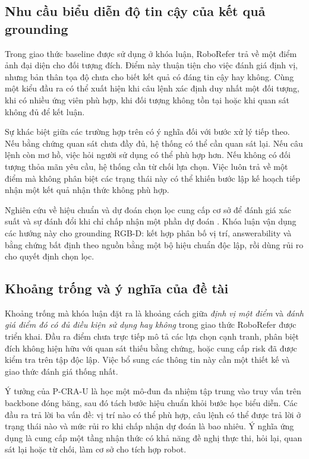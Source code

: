 \subsection{Nhu cầu biểu diễn độ tin cậy của kết quả grounding}

Trong giao thức baseline được sử dụng ở khóa luận, RoboRefer trả về một điểm ảnh đại diện cho đối tượng đích. Điểm này thuận tiện cho việc đánh giá định vị, nhưng bản thân tọa độ chưa cho biết kết quả có đáng tin cậy hay không. Cùng một kiểu đầu ra có thể xuất hiện khi câu lệnh xác định duy nhất một đối tượng, khi có nhiều ứng viên phù hợp, khi đối tượng không tồn tại hoặc khi quan sát không đủ để kết luận.

Sự khác biệt giữa các trường hợp trên có ý nghĩa đối với bước xử lý tiếp theo. Nếu bằng chứng quan sát chưa đầy đủ, hệ thống có thể cần quan sát lại. Nếu câu lệnh còn mơ hồ, việc hỏi người sử dụng có thể phù hợp hơn. Nếu không có đối tượng thỏa mãn yêu cầu, hệ thống cần từ chối lựa chọn. Việc luôn trả về một điểm mà không phân biệt các trạng thái này có thể khiến bước lập kế hoạch tiếp nhận một kết quả nhận thức không phù hợp.

Nghiên cứu về hiệu chuẩn và dự đoán chọn lọc cung cấp cơ sở để đánh giá xác suất và sự đánh đổi khi chỉ chấp nhận một phần dự đoán \cite{guo2017calibration,geifman2017selective}. Khóa luận vận dụng các hướng này cho grounding RGB-D: kết hợp phân bố vị trí, answerability và bằng chứng bất định theo nguồn bằng một bộ hiệu chuẩn độc lập, rồi dùng rủi ro cho quyết định chọn lọc.

\subsection{Khoảng trống và ý nghĩa của đề tài}

Khoảng trống mà khóa luận đặt ra là khoảng cách giữa \emph{định vị một điểm} và \emph{đánh giá điểm đó có đủ điều kiện sử dụng hay không} trong giao thức RoboRefer được triển khai. Đầu ra điểm chưa trực tiếp mô tả các lựa chọn cạnh tranh, phân biệt đích không hiện hữu với quan sát thiếu bằng chứng, hoặc cung cấp risk đã được kiểm tra trên tập độc lập. Việc bổ sung các thông tin này cần một thiết kế và giao thức đánh giá thống nhất.

Ý tưởng của P-CRA-U là học một mô-đun đa nhiệm tập trung vào truy vấn trên backbone đóng băng, sau đó tách bước hiệu chuẩn khỏi bước học biểu diễn. Các đầu ra trả lời ba vấn đề: vị trí nào có thể phù hợp, câu lệnh có thể được trả lời ở trạng thái nào và mức rủi ro khi chấp nhận dự đoán là bao nhiêu. Ý nghĩa ứng dụng là cung cấp một tầng nhận thức có khả năng đề nghị thực thi, hỏi lại, quan sát lại hoặc từ chối, làm cơ sở cho tích hợp robot.

